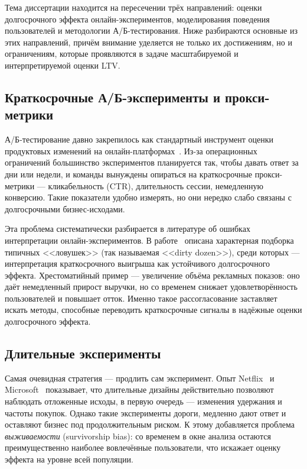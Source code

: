 Тема диссертации находится на пересечении трёх направлений: оценки
долгосрочного эффекта онлайн-экспериментов, моделирования поведения
пользователей и методологии А/Б-тестирования. Ниже разбираются основные из
этих направлений, причём внимание уделяется не только их достижениям, но и
ограничениям, которые проявляются в задаче масштабируемой и интерпретируемой
оценки LTV.

\subsection*{Краткосрочные А/Б-эксперименты и прокси-метрики}

А/Б-тестирование давно закрепилось как стандартный инструмент оценки
продуктовых изменений на онлайн-платформах~\cite{kohavi2020trustworthy}.
Из-за операционных ограничений большинство экспериментов планируется так,
чтобы давать ответ за дни или недели, и команды вынуждены опираться на
краткосрочные прокси-метрики --- кликабельность (CTR), длительность сессии,
немедленную конверсию. Такие показатели удобно измерять, но они нередко
слабо связаны с долгосрочными бизнес-исходами.

Эта проблема систематически разбирается в литературе об ошибках
интерпретации онлайн-экспериментов. В работе~\cite{dmitriev2016dirty}
описана характерная подборка типичных <<ловушек>> (так называемая
<<dirty dozen>>), среди которых --- интерпретация краткосрочного выигрыша
как устойчивого долгосрочного эффекта. Хрестоматийный пример ---
увеличение объёма рекламных показов: оно даёт немедленный прирост выручки,
но со временем снижает удовлетворённость пользователей и повышает отток.
Именно такое рассогласование заставляет искать методы, способные переводить
краткосрочные сигналы в надёжные оценки долгосрочного эффекта.

\subsection*{Длительные эксперименты}

Самая очевидная стратегия --- продлить сам эксперимент. Опыт
Netflix~\cite{dimakopoulou2023evaluating} и
Microsoft~\cite{sadeghi2021novelty} показывает, что длительные дизайны
действительно позволяют наблюдать отложенные исходы, в первую очередь ---
изменения удержания и частоты покупок. Однако такие эксперименты дороги,
медленно дают ответ и оставляют бизнес под продолжительным риском.
К этому добавляется проблема \textit{выживаемости} (survivorship bias):
со временем в окне анализа остаются преимущественно наиболее вовлечённые
пользователи, что искажает оценку эффекта на уровне всей популяции.

